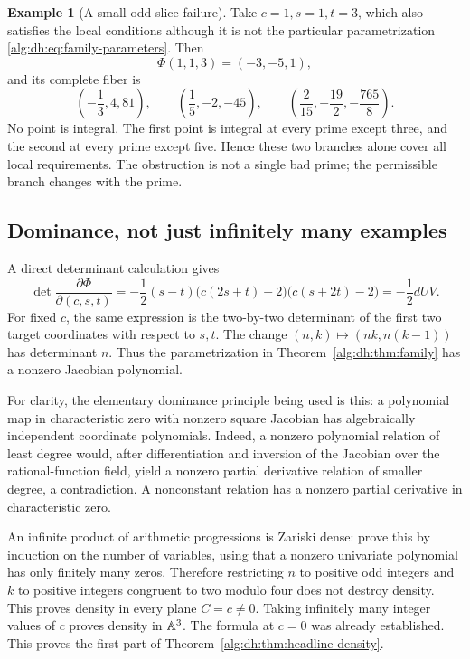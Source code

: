 \documentclass[11pt]{article}
\numberwithin{equation}{section}
\theoremstyle{plain}
\theoremstyle{plain}
\theoremstyle{plain}
\theoremstyle{definition}
\theoremstyle{definition}
\theoremstyle{definition}
\newtheorem{example}[example]{Example}
\theoremstyle{remark}
\begin{document}
\begin{example}[A small odd-slice failure]\label{alg:dh:ex:small}
Take $c=1,s=1,t=3$, which also satisfies the local conditions although it
is not the particular parametrization \eqref{alg:dh:eq:family-parameters}.
Then
\[
 \Phi(1,1,3)=(-3,-5,1),
\]
and its complete fiber is
\[
 \left(-\frac13,4,81\right),\qquad
 \left(\frac15,-2,-45\right),\qquad
 \left(\frac2{15},-\frac{19}2,-\frac{765}8\right).
\]
No point is integral. The first point is integral at every prime except
three, and the second at every prime except five. Hence these two branches
alone cover all local requirements. The obstruction is not a single bad
prime; the permissible branch changes with the prime.
\end{example}

\subsection{Dominance, not just infinitely many examples}
A direct determinant calculation gives
\begin{equation}\label{alg:dh:eq:Phi-Jacobian}
 \det\frac{\partial\Phi}{\partial(c,s,t)}
 =-\frac12(s-t)\bigl(c(2s+t)-2\bigr)\bigl(c(s+2t)-2\bigr)
 =-\frac12dUV.
\end{equation}
For fixed $c$, the same expression is the two-by-two determinant of the
first two target coordinates with respect to $s,t$. The change
$(n,k)\mapsto(nk,n(k-1))$ has determinant $n$. Thus the parametrization
in Theorem~\ref{alg:dh:thm:family} has a nonzero Jacobian polynomial.

For clarity, the elementary dominance principle being used is this:
a polynomial map in characteristic zero with nonzero square Jacobian
has algebraically independent coordinate polynomials. Indeed, a nonzero
polynomial relation of least degree would, after differentiation and
inversion of the Jacobian over the rational-function field, yield a
nonzero partial derivative relation of smaller degree, a contradiction.
A nonconstant relation has a nonzero partial derivative in characteristic
zero.

An infinite product of arithmetic progressions is Zariski dense: prove
this by induction on the number of variables, using that a nonzero
univariate polynomial has only finitely many zeros. Therefore restricting
$n$ to positive odd integers and $k$ to positive integers congruent to
two modulo four does not destroy density. This proves density in every
plane $C=c\ne0$. Taking infinitely many integer values of $c$ proves
density in $\mathbb A^3$. The formula at $c=0$ was already established.
This proves the first part of Theorem~\ref{alg:dh:thm:headline-density}.
\end{document}

